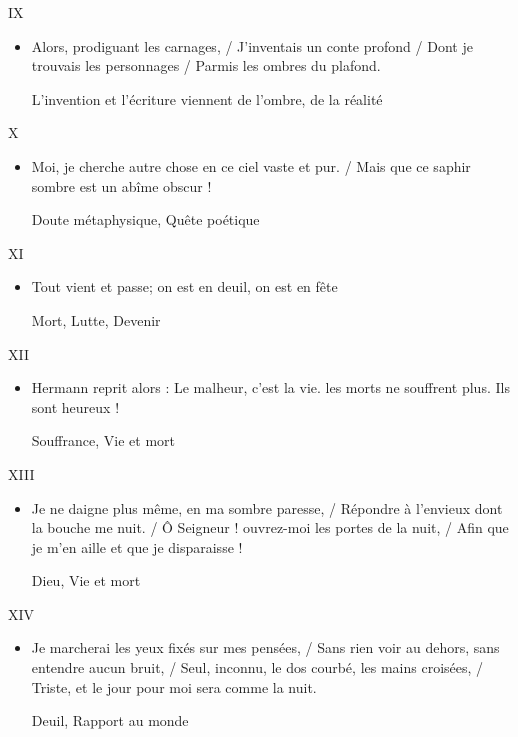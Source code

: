 \documentclass[french,a4paper,11pt,answers]{exam}
\newcommand{\cit}[2]{\og #1 \fg{} \begin{solution}{ #2 }\end{solution}} %
\begin{document}
	\begin{cadre}{IX}
		\begin{itemize}
			\item \cit{Alors, prodiguant les carnages, / J'inventais un conte profond / Dont je trouvais les personnages / Parmis les ombres du plafond.}
				{L'invention et l'écriture viennent de l'ombre, de la réalité}
		\end{itemize}
	\end{cadre}
	
	\begin{cadre}{X}
		\begin{itemize}
			\item \cit{Moi, je cherche autre chose en ce ciel vaste et pur. / Mais que ce saphir sombre est un abîme obscur !}
				{Doute métaphysique, Quête poétique}
		\end{itemize}
	\end{cadre}
	
	\begin{cadre}{XI}
		\begin{itemize}
			\item \cit{Tout vient et passe; on est en deuil, on est en fête}
				{Mort, Lutte, Devenir}
		\end{itemize}
	\end{cadre}
	
	\begin{cadre}{XII}
		\begin{itemize}
			\item \cit{Hermann reprit alors : \og Le malheur, c'est la vie. les morts ne souffrent plus. Ils sont heureux ! \fg}
				{Souffrance, Vie et mort}
		\end{itemize}
	\end{cadre}
	
	\begin{cadre}{XIII}
		\begin{itemize}
			\item \cit{Je ne daigne plus même, en ma sombre paresse, / Répondre à l'envieux dont la bouche me nuit. / Ô Seigneur ! ouvrez-moi les portes de la nuit, / Afin que je m'en aille et que je disparaisse !}
				{Dieu, Vie et mort}
		\end{itemize}
	\end{cadre}
	
	\begin{cadre}{XIV}
		\begin{itemize}
			\item \cit{Je marcherai les yeux fixés sur mes pensées, / Sans rien voir au dehors, sans entendre aucun bruit, / Seul, inconnu, le dos courbé, les mains croisées, / Triste, et le jour pour moi sera comme la nuit.}
				{Deuil, Rapport au monde}
		\end{itemize}
	\end{cadre}
	
\end{document}
